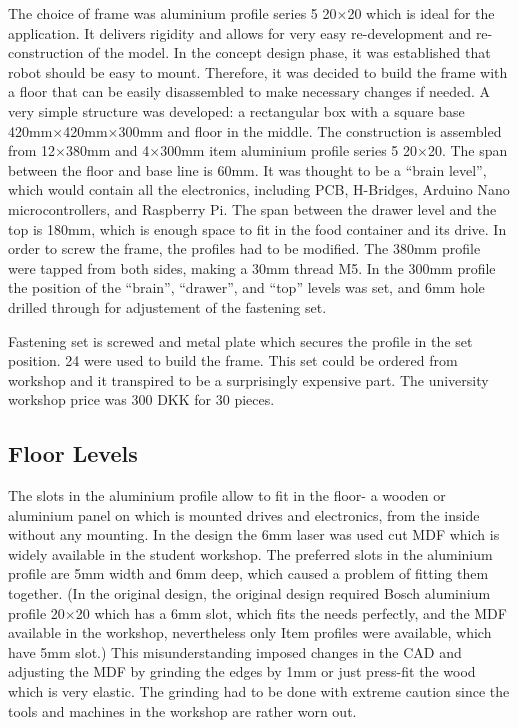 \documentclass[11pt]{article}
\begin{document}
The choice of frame was aluminium profile series 5 20$\times$20 which is ideal for the application. It delivers rigidity and allows for very easy re-development and re-construction of the model. In the concept design phase, it was established that robot should be easy to mount. Therefore, it was decided to build the frame with a floor that can be easily disassembled to make necessary changes if needed. A very simple structure was developed: a rectangular box with a square base 420mm$\times$420mm$\times$300mm and floor in the middle. The construction is assembled from 12$\times$380mm and 4$\times$300mm item aluminium profile series 5 20$\times$20.  The span between the floor and base line is 60mm. It was thought to be a ``brain level'', which would contain all the electronics, including PCB, H-Bridges, Arduino Nano microcontrollers, and Raspberry Pi. The span between the drawer level and the top is 180mm, which is enough space to fit in the food container and its drive. In order to screw the frame, the profiles had to be modified. The 380mm profile were tapped from both sides, making a 30mm thread M5. In the 300mm profile the position of the ``brain'', ``drawer'', and ``top'' levels was set, and 6mm hole drilled through for adjustement of the fastening set.


Fastening set is screwed and metal plate which secures the profile in the set position. 24 were used to build the frame. This set could be ordered from workshop and it transpired to be a surprisingly expensive part. The university workshop price was 300 DKK for 30 pieces.

\subsection*{Floor Levels}

The slots in the aluminium profile allow to fit in the floor- a wooden or aluminium panel on which is mounted drives and electronics, from the inside without any mounting. In the design the 6mm laser was used cut MDF which is widely available in the student workshop. The preferred slots in the aluminium profile are 5mm width and 6mm deep, which caused a problem of fitting them together. (In the original design, the original design required Bosch aluminium profile 20$\times$20 which has a 6mm slot, which fits the needs perfectly, and the MDF available in the workshop, nevertheless only Item profiles were available, which have 5mm slot.) This misunderstanding imposed changes in the CAD and adjusting the MDF by grinding the edges by 1mm or just press-fit the wood which is very elastic. The grinding had to be done with extreme caution since the tools and machines in the workshop are rather worn out.
\end{document}
